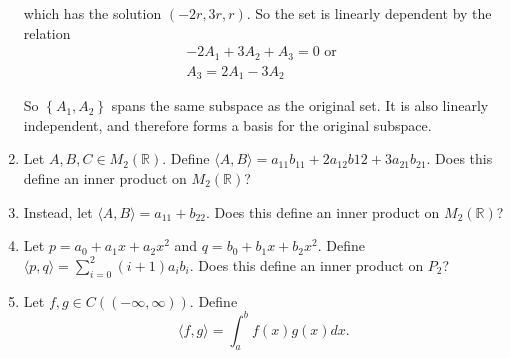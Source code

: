 \documentclass[a4paper,10pt]{report}
\begin{document}
\begin{enumerate}
    which has the solution $(-2r,3r,r)$. So the set is linearly dependent by the relation
    \begin{align*}
    -2A_1 + 3A_2 + A_3 = 0 \text{ or }\\
    A_3 = 2A_1 - 3A_2
    \end{align*}

    So $\left\{A_1, A_2\right\}$ spans the same subspace as the original set. It is also linearly independent, and therefore forms a basis for the original subspace.

    \hrulefill

  \item
    Let $A, B, C \in M_2 (\mathbb{R})$. Define $\langle A,B\rangle = a_{11}b_{11}+2a_{12}b{12}+3a_{21}b_{21}$. Does this define an inner product on $M_2 (\mathbb{R})$?

  \item
    Instead, let $\langle A,B\rangle = a_{11} + b_{22}$. Does this define an inner product on $M_2(\mathbb{R})$?

  \item
    Let $p=a_0 + a_1 x + a_2 x^2$ and $q=b_0 + b_1 x + b_2 x^2$.
    Define $\langle p,q\rangle = \sum_{i=0}^{2}(i+1)a_i b_i$. Does this define an inner product on $P_2$?

  \item
    Let $f,g \in C((-\infty, \infty))$. Define
    \begin{equation*}
      \langle f,g\rangle = \int_a^b f(x)g(x)dx.
    \end{equation*}

\end{enumerate}
\end{document}
